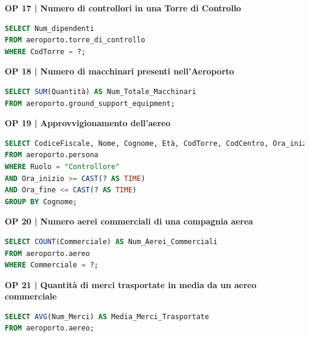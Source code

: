\textbf{\small OP 17 | Numero di controllori in una Torre di Controllo}\\

\begin{lstlisting}[language=SQL]
SELECT Num_dipendenti
FROM aeroporto.torre_di_controllo
WHERE CodTorre = ?;	
\end{lstlisting}


\textbf{\small OP 18 | Numero di macchinari presenti nell'Aeroporto}\\

\begin{lstlisting}[language=SQL]
SELECT SUM(Quantità) AS Num_Totale_Macchinari
FROM aeroporto.ground_support_equipment;	
\end{lstlisting}


\textbf{\small OP 19 | Approvvigionamento dell'aereo}\\

\begin{lstlisting}[language=SQL]
SELECT CodiceFiscale, Nome, Cognome, Età, CodTorre, CodCentro, Ora_inizio, Ora_fine
FROM aeroporto.persona
WHERE Ruolo = "Controllore"
AND Ora_inizio >= CAST(? AS TIME)
AND Ora_fine <= CAST(? AS TIME)
GROUP BY Cognome;	
\end{lstlisting}


\textbf{\small OP 20 | Numero aerei commerciali di una compagnia aerea}\\

\begin{lstlisting}[language=SQL]
SELECT COUNT(Commerciale) AS Num_Aerei_Commerciali
FROM aeroporto.aereo
WHERE Commerciale = ?;
\end{lstlisting}


\textbf{\small OP 21 | Quantità di merci trasportate in media da un aereo commerciale}\\

\begin{lstlisting}[language=SQL]
SELECT AVG(Num_Merci) AS Media_Merci_Trasportate
FROM aeroporto.aereo;	
\end{lstlisting}